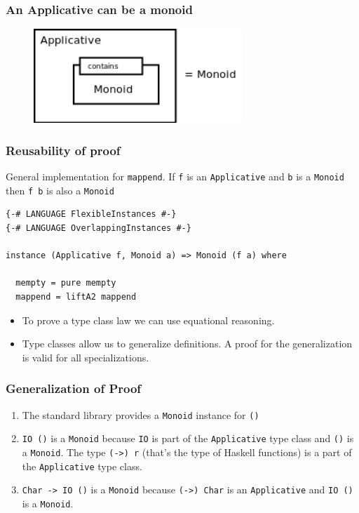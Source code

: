 \documentclass{beamer}
\begin{document}
\begin{frame}[fragile]
  \frametitle{An Applicative can be a monoid}
\begin{figure}
  \centering
     \includegraphics[width=0.7\textwidth]{monoid}
\end{figure}
\end{frame}


\begin{frame}[fragile]
\frametitle{Reusability of proof}
General implementation for \verb|mappend|. If \verb|f| is an \verb|Applicative| and \verb|b| is a \verb|Monoid| then \verb|f b| is also a \verb|Monoid|
\begin{verbatim}
{-# LANGUAGE FlexibleInstances #-}
{-# LANGUAGE OverlappingInstances #-}

instance (Applicative f, Monoid a) => Monoid (f a) where

  mempty = pure mempty
  mappend = liftA2 mappend
\end{verbatim}
\begin{itemize}
\item To prove a type class law we can use equational reasoning.
\item Type classes allow us to generalize definitions. A proof for the generalization is valid for all specializations.

\end{itemize}

\end{frame}

\begin{frame}[fragile]
\frametitle{Generalization of Proof}

\begin{enumerate}
\item The standard library provides a \verb|Monoid| instance for \verb|()| 

\item  \verb|IO ()| is a \verb|Monoid| because \verb|IO| is part of the \verb|Applicative| type class and \verb|()| is a \verb|Monoid|. The type \verb|(->) r| (that's the type of Haskell functions) is a part of the \verb|Applicative| type class.

\item 
\verb|Char -> IO ()| is a \verb|Monoid| because \verb|(->) Char| is an \verb|Applicative| and \verb|IO ()| is a \verb|Monoid|.

\end{enumerate} 
\end{frame}
\end{document}
